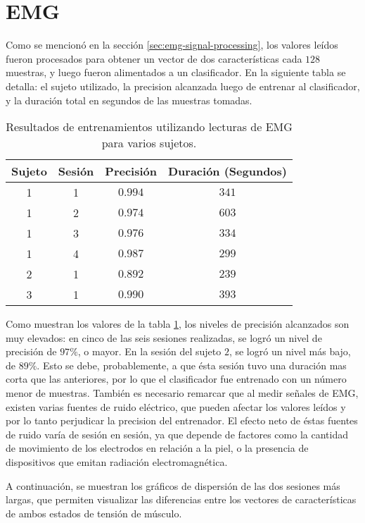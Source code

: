 \section{EMG}

Como se mencionó en la sección \ref{sec:emg-signal-processing}, los valores leídos fueron procesados para obtener un vector de dos características cada $128$ muestras, y luego fueron alimentados a un clasificador. En la siguiente tabla se detalla: el sujeto utilizado, la precision alcanzada luego de entrenar al clasificador, y la duración total en segundos de las muestras tomadas.

\begin{table}[H]
\centering
\begin{tabular}{ |c|c|c|c| } 
 \hline
 Sujeto & Sesión & Precisión & Duración (Segundos) \\ 
 \hline
 1 & 1 & $0.994$ & $341$ \\
 \hline
 1 & 2 & $0.974$ & $603$ \\
 \hline
 1 & 3 & $0.976$ & $334$ \\
 \hline
 1 & 4 & $0.987$ & $299$ \\
  \hline
 2 & 1 & $0.892$ & $239$ \\
  \hline
 3 & 1 & $0.990$ & $393$ \\

 \hline
\end{tabular}
\caption{Resultados de entrenamientos utilizando lecturas de EMG para varios sujetos.}
\label{tab:emg-results}
\end{table}

Como muestran los valores de la tabla \ref{tab:emg-results}, los niveles de precisión alcanzados son muy elevados: en cinco de las seis sesiones realizadas, se logró un nivel de precisión de $97\%$, o mayor.  En la sesión del sujeto $2$, se logró un nivel más bajo, de $89\%$. Esto se debe, probablemente, a que ésta sesión tuvo una duración mas corta que las anteriores, por lo que el clasificador fue entrenado con un número menor de muestras. También es necesario remarcar que al medir señales de EMG, existen varias fuentes de ruido eléctrico, que pueden afectar los valores leídos y por lo tanto perjudicar la precision del entrenador. El efecto neto de éstas fuentes de ruido varía de sesión en sesión, ya que depende de factores como la cantidad de movimiento de los electrodos en relación a la piel, o la presencia de dispositivos que emitan radiación electromagnética\cite{emg-delsys}.

A continuación, se muestran los gráficos de dispersión de las dos sesiones más largas, que permiten visualizar las diferencias entre los vectores de características de ambos estados de tensión de músculo.

